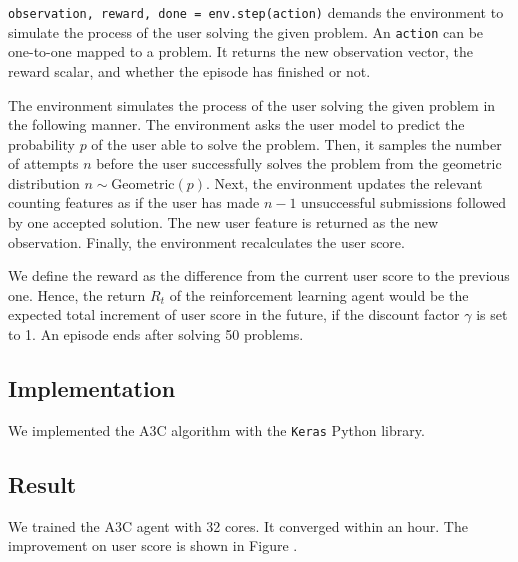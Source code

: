         \verb|observation, reward, done = env.step(action)|
        demands the environment to simulate the process of the user solving the given problem.
        An \verb|action| can be one-to-one mapped to a problem.
        It returns the new observation vector, the reward scalar, and whether the episode has finished or not.

        The environment simulates the process of the user solving the given problem in the following manner.
        The environment asks the user model to predict the probability $p$ of the user able to solve the problem.
        Then, it samples the number of attempts $n$ before the user successfully solves the problem
        from the geometric distribution $n \sim \mathrm{Geometric}(p)$.
        Next, the environment updates the relevant counting features
        as if the user has made $n-1$ unsuccessful submissions followed by one accepted solution.
        The new user feature is returned as the new observation.
        Finally, the environment recalculates the user score.

        We define the reward as the difference from the current user score to the previous one.
        Hence, the return $R_t$ of the reinforcement learning agent
        would be the expected total increment of user score in the future,
        if the discount factor $\gamma$ is set to 1.
        An episode ends after solving 50 problems.

    \subsection{Implementation}

        We implemented the A3C algorithm with the \verb|Keras|\cite{chollet2015keras} Python library.

    \subsection{Result}

        We trained the A3C agent with 32 cores.
        It converged within an hour.
        The improvement on user score is shown in Figure .









